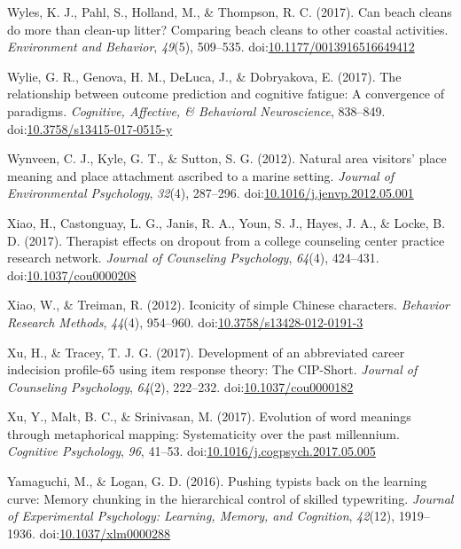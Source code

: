 \documentclass[english,man]{apa6}
\theoremstyle{definition}
\theoremstyle{definition}
\theoremstyle{definition}
\theoremstyle{remark}
\begin{document}
\hypertarget{ref-Wyles2017}{}
Wyles, K. J., Pahl, S., Holland, M., \& Thompson, R. C. (2017). Can
beach cleans do more than clean-up litter? Comparing beach cleans to
other coastal activities. \emph{Environment and Behavior}, \emph{49}(5),
509--535.
doi:\href{https://doi.org/10.1177/0013916516649412}{10.1177/0013916516649412}

\hypertarget{ref-Wylie2017}{}
Wylie, G. R., Genova, H. M., DeLuca, J., \& Dobryakova, E. (2017). The
relationship between outcome prediction and cognitive fatigue: A
convergence of paradigms. \emph{Cognitive, Affective, \& Behavioral
Neuroscience}, 838--849.
doi:\href{https://doi.org/10.3758/s13415-017-0515-y}{10.3758/s13415-017-0515-y}

\hypertarget{ref-Wynveen2012}{}
Wynveen, C. J., Kyle, G. T., \& Sutton, S. G. (2012). Natural area
visitors' place meaning and place attachment ascribed to a marine
setting. \emph{Journal of Environmental Psychology}, \emph{32}(4),
287--296.
doi:\href{https://doi.org/10.1016/j.jenvp.2012.05.001}{10.1016/j.jenvp.2012.05.001}

\hypertarget{ref-Xiao2017}{}
Xiao, H., Castonguay, L. G., Janis, R. A., Youn, S. J., Hayes, J. A., \&
Locke, B. D. (2017). Therapist effects on dropout from a college
counseling center practice research network. \emph{Journal of Counseling
Psychology}, \emph{64}(4), 424--431.
doi:\href{https://doi.org/10.1037/cou0000208}{10.1037/cou0000208}

\hypertarget{ref-Xiao2012}{}
Xiao, W., \& Treiman, R. (2012). Iconicity of simple Chinese characters.
\emph{Behavior Research Methods}, \emph{44}(4), 954--960.
doi:\href{https://doi.org/10.3758/s13428-012-0191-3}{10.3758/s13428-012-0191-3}

\hypertarget{ref-Xu2017}{}
Xu, H., \& Tracey, T. J. G. (2017). Development of an abbreviated career
indecision profile-65 using item response theory: The CIP-Short.
\emph{Journal of Counseling Psychology}, \emph{64}(2), 222--232.
doi:\href{https://doi.org/10.1037/cou0000182}{10.1037/cou0000182}

\hypertarget{ref-Xu2017a}{}
Xu, Y., Malt, B. C., \& Srinivasan, M. (2017). Evolution of word
meanings through metaphorical mapping: Systematicity over the past
millennium. \emph{Cognitive Psychology}, \emph{96}, 41--53.
doi:\href{https://doi.org/10.1016/j.cogpsych.2017.05.005}{10.1016/j.cogpsych.2017.05.005}

\hypertarget{ref-Yamaguchi2017}{}
Yamaguchi, M., \& Logan, G. D. (2016). Pushing typists back on the
learning curve: Memory chunking in the hierarchical control of skilled
typewriting. \emph{Journal of Experimental Psychology: Learning, Memory,
and Cognition}, \emph{42}(12), 1919--1936.
doi:\href{https://doi.org/10.1037/xlm0000288}{10.1037/xlm0000288}
\end{document}

